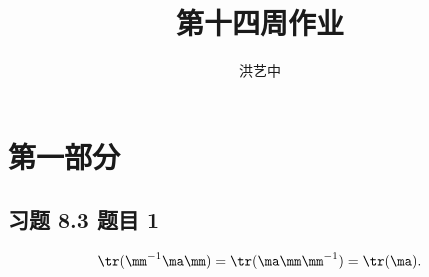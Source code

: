 \title{第十四周作业}
\author{洪艺中}
\maketitle
\section{第一部分}
\newcommand{\lvec}[1]{\overrightarrow{#1}}

\subsection*{ 习题 8.3 题目 1 }
\begin{solution}
\[
\tr (\mm^{-1} \ma \mm) = \tr (\ma \mm \mm^{-1}) = \tr (\ma).
\]
\end{solution}

